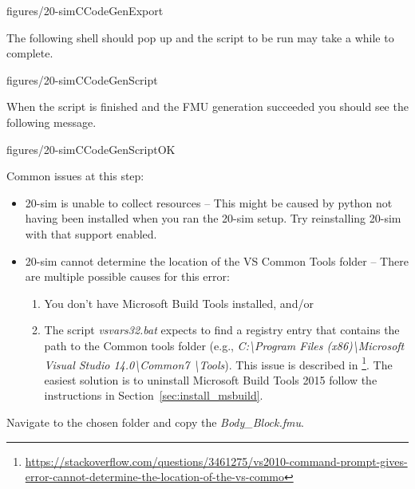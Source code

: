 \documentclass[11pt,a4paper]{../tutorial}
\begin{document}
\begin{instructions}
   \begin{annotation}[width=0.5\linewidth]{figures/20-simCCodeGenExport}
   \end{annotation}

\newpage

\item The following shell should pop up and the script to be run may take a while to complete.

   \begin{annotation}[width=0.8\linewidth]{figures/20-simCCodeGenScript}
   \end{annotation}

\item When the script is finished and the FMU generation succeeded you should see the following message.

   \begin{annotation}[width=0.8\linewidth]{figures/20-simCCodeGenScriptOK}
   \end{annotation}

	Common issues at this step:
	\begin{itemize}
		\item 20-sim is unable to collect resources -- This might be caused by python not having been installed when you ran the 20-sim setup. Try reinstalling 20-sim with that support enabled.
		\item 20-sim cannot determine the location of the VS Common Tools folder -- There are multiple possible causes for this error:
		\begin{enumerate}
			\item You don't have Microsoft Build Tools installed, and/or
			\item The script \emph{vsvars32.bat} expects to find a registry entry that contains the path to the Common tools folder (e.g., \emph{C:\textbackslash Program Files (x86)\textbackslash Microsoft Visual Studio 14.0\textbackslash Common7 \textbackslash Tools}). This issue is described in \footnote{\url{https://stackoverflow.com/questions/3461275/vs2010-command-prompt-gives-error-cannot-determine-the-location-of-the-vs-commo}}. The easiest solution is to uninstall Microsoft Build Tools 2015 follow the instructions in Section~\ref{sec:install_msbuild}.
		\end{enumerate}
	\end{itemize}

\clearpage

\item Navigate to the chosen folder and copy the \emph{Body\_Block.fmu}.


\end{instructions}
\end{document}
